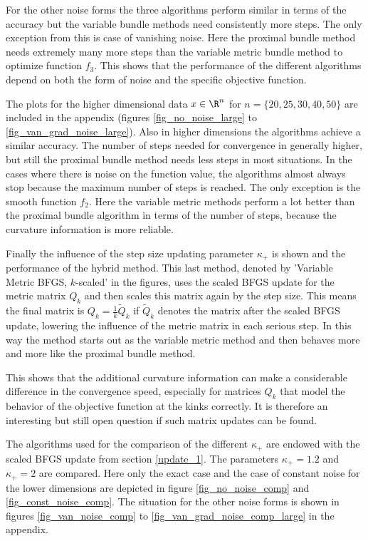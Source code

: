 For the other noise forms the three algorithms perform similar in terms of the accuracy but the variable bundle methods need consistently more steps.
The only exception from this is case of vanishing noise. Here the proximal bundle method needs extremely many more steps  than the variable metric bundle method to optimize function \(f_3\). This shows that the performance of the different algorithms depend on both the form of noise and the specific objective function.

The plots for the higher dimensional data \(x \in \R^n\) for \(n = \{20,25,30,40,50\}\) are included in the appendix (figures \ref{fig_no_noise_large} to \ref{fig_van_grad_noise_large}).
Also in higher dimensions the algorithms achieve a similar accuracy. The number of steps needed for convergence in generally higher, but still the proximal bundle method needs less steps in most situations.
In the cases where there is noise on the function value, the algorithms almost always stop because the maximum number of steps is reached. The only exception is the smooth function \(f_2\). Here the variable  metric methods perform a lot better  than the proximal bundle algorithm in terms of the number  of steps, because the curvature information is more reliable.

Finally the influence of the step size updating parameter \(\kappa_+\) is shown and the performance of the hybrid method.
This last method, denoted by 'Variable Metric BFGS, \(k\)-scaled' in the figures, uses the scaled BFGS update for the metric matrix \(Q_k\) and then scales this matrix again by the step size. This means the final matrix is \(Q_k = \frac{1}{k}\tilde{Q}_k\) if \(\tilde{Q}_k\) denotes the matrix after the scaled BFGS update, lowering the influence of the metric matrix in each serious step.
In this way the method starts out as the variable metric method and then behaves more and more like the proximal bundle method.

This shows that the additional curvature information can make a considerable difference in the convergence speed, especially for matrices \(Q_k\) that model the behavior of the objective function at the kinks correctly.
It is therefore an interesting but still open question if such matrix updates can be found.

The algorithms used for the comparison of the different \(\kappa_+\) are endowed with the scaled BFGS update from section \ref{update_1}. The parameters \(\kappa_+ = 1.2\) and \(\kappa_+ = 2\) are compared.
Here only the exact case and the case of constant noise for the lower dimensions are depicted in figure \ref{fig_no_noise_comp} and \ref{fig_const_noise_comp}. The situation for the other noise forms is shown in figures \ref{fig_van_noise_comp} to \ref{fig_van_grad_noise_comp_large}  in the appendix.

